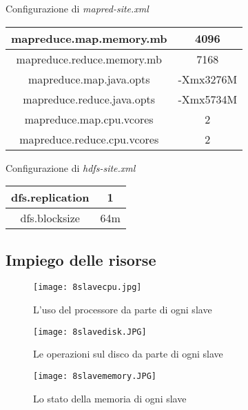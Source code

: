 \begin{center}
Configurazione di \textit{mapred-site.xml}\\
\begin{tabular}{ | c | c |} 
\hline
mapreduce.map.memory.mb & 4096 \\ 
\hline
mapreduce.reduce.memory.mb & 7168 \\ 
\hline
mapreduce.map.java.opts & -Xmx3276M \\
\hline
mapreduce.reduce.java.opts & -Xmx5734M \\ 
\hline
mapreduce.map.cpu.vcores & 2 \\
\hline
mapreduce.reduce.cpu.vcores & 2 \\
\hline
\end{tabular}
\end{center}

\begin{center}
Configurazione di \textit{hdfs-site.xml}\\
\begin{tabular}{ | c | c |} 
\hline
dfs.replication & 1 \\ 
\hline
dfs.blocksize & 64m \\ 
\hline
\end{tabular}
\end{center}

\subsection{Impiego delle risorse}

\begin{figure}
  \begin{center}
    \texttt{[image: 8slavecpu.jpg]}
    \caption{L'uso del processore da parte di ogni slave}
    \label{fig:8slavecpu.jpg}
  \end{center}
\end{figure}

\begin{figure}
  \begin{center}
    \texttt{[image: 8slavedisk.JPG]}
    \caption{Le operazioni sul disco da parte di ogni slave}
    \label{fig:8slavedisk.jpg}
  \end{center}
\end{figure}

\begin{figure}
  \begin{center}
    \texttt{[image: 8slavememory.JPG]}
    \caption{Lo stato della memoria di ogni slave}
    \label{fig:8slavememory.JPG}
  \end{center}
\end{figure}

